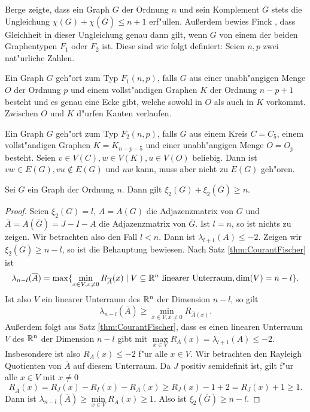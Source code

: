   Berge \cite[Kapitel 15, Satz 2]{Berge91} zeigte, dass ein Graph $G$ der Ordnung $n$ und sein Komplement $\overline{G}$ stets die Ungleichung $\chi(G) + \chi(\overline{G}) \leq n+1$ erf"ullen. Au{\ss}erdem bewies Finck \cite{Finck66}, dass Gleichheit in dieser Ungleichung genau dann gilt, wenn $G$ von einem der beiden Graphentypen $F_1$ oder $F_2$ ist. 
  Diese sind wie folgt definiert:
  Seien $n,p$ zwei nat"urliche Zahlen. 

  Ein Graph $G$ geh"ort zum Typ $F_1 (n,p)$, falls $G$ aus einer unabh"angigen Menge $O$ der Ordnung $p$ und einem vollst"andigen Graphen $K$ der Ordnung $n-p+1$ besteht und es genau eine Ecke gibt, welche sowohl in $O$ als auch in $K$ vorkommt. Zwischen $O$ und $K$ d"urfen Kanten verlaufen. 

  Ein Graph $G$ geh"ort zum Typ $F_2(n,p)$, falls $G$ aus einem Kreis $C=C_5$, einem vollst"andigen Graphen $K=K_{n-p-5}$ und einer unabh"angigen Menge $O=O_{p}$ besteht. 
  Seien $v\in V(C), w\in V(K), u\in V(O)$ beliebig. Dann ist $vw\in E(G), vu\notin E(G) $ und $uw$ kann, muss aber nicht zu $E(G)$ geh"oren.

  \begin{theorem}
    Sei $G$ ein Graph der Ordnung $n$. Dann gilt 
    $\xi_{2}(G) + \xi_{2}(\overline{G}) \geq n.$ 
    \label{thm:xikomplement}
  \end{theorem}
  \begin{proof}
    Seien $\xi_{2}(G) = l$, $A= A(G)$ die Adjazenzmatrix von $G$ und $\overline A = A(\overline{G}) = J-I-A $ die Adjazenzmatrix von $\overline{G}$. 
    Ist $l = n$, so ist nichts zu zeigen. Wir betrachten also den Fall $l< n$. Dann ist $\lambda_{l+1}(A) \leq -2$. Zeigen wir $\xi_{2}(\overline{G}) \geq n-l$, so ist die Behauptung bewiesen. 
    Nach Satz \ref{thm:CourantFischer} ist 
    $$\lambda_{n-l}(\overline{A}) = \max\{\min\limits_{x\in V , x \neq 0} R_{\overline{A}}(x) \;|\;  V\subseteq {\mathbb{R}}^n \text{ linearer Unterraum,} \operatorname{dim}(V) =  n-l \}.$$
    Ist also $V$ ein linearer Unterraum des ${\mathbb{R}}^{n}$ der Dimension $n-l$, so gilt $$\lambda_{n-l} (\overline{A}) \geq \min\limits_{x\in V, x\neq 0} R_{\overline{A}(x)}.$$
    Au{\ss}erdem folgt aus Satz \ref{thm:CourantFischer}, dass es einen linearen Unterraum $V$ des ${\mathbb{R}}^{n}$ der Dimension $n-l$ gibt mit $ \max \limits_{x\in V}R_{A}(x) =\lambda_{l+1} (A)  \leq -2$.
    Insbesondere ist also $R_{A}(x) \leq -2$ f"ur alle $x\in V$.
    Wir betrachten den Rayleigh Quotienten von $\overline{A}$ auf diesem Unterraum. Da $J$ positiv semidefinit ist, gilt f"ur alle $x\in V$ mit $x\neq 0$
    $$R_{\overline{A}}(x) = R_{J}(x) - R_I(x) - R_A(x) \geq  R_J(x) - 1 + 2 = R_J(x) +1  \geq 1.$$
    Dann ist $\lambda_{n-l}(\overline{A}) \geq \min\limits_{x\in V} R_{\overline{A}}(x) \geq 1$. 
    Also ist $\xi_{2}(\overline{G}) \geq n-l$. 
  \end{proof}



